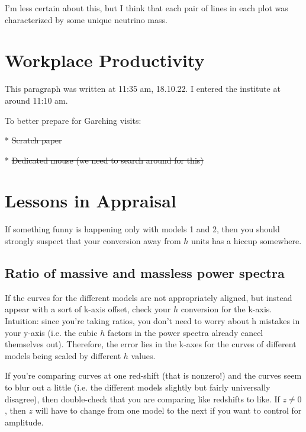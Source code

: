 \documentclass[11pt]{article}
\begin{document}
I'm less certain about this, but I think that each pair of lines in each plot
was characterized by some unique neutrino mass.





\section{Workplace Productivity}

This paragraph was written at 11:35 am, 18.10.22. I entered the institute at
around 11:10 am.

To better prepare for Garching visits:

* \sout{Scratch paper}

* \sout{Dedicated mouse (we need to search around for this)}

\section{Lessons in Appraisal}

    If something funny is happening only with models 1 and 2, then you should
    strongly suspect that your conversion away from $h$ units has a hiccup
    somewhere.

    \subsection{Ratio of massive and massless power spectra}

        If the curves for the different models are not appropriately aligned,
        but instead appear with a sort of k-axis offset, check your $h$
        conversion for the k-axis. Intuition: since you're taking ratios, you
        don't need to worry about h mistakes in your y-axis (i.e. the cubic
        $h$ factors in the power spectra already cancel themselves out).
        Therefore, the error lies in the k-axes for the curves of different
        models being scaled by different $h$ values.

        If you're comparing curves at one red-shift (that is nonzero!) and the
        curves seem to blur out a little (i.e. the different models slightly
        but fairly universally disagree), then double-check that you are
        comparing like redshifts to like. If $z \neq 0$, then $z$ will have
        to change from one model to the next if you want to control for
        amplitude.
\end{document}
